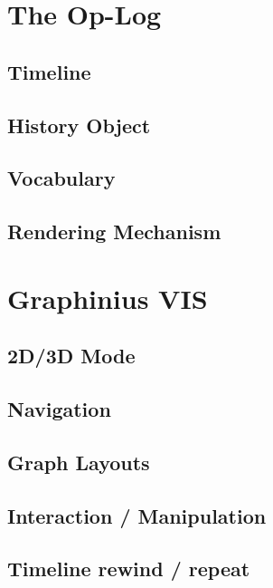 \section{The Op-Log}
\label{sect:op_log}

	\subsection{Timeline}
	\label{ssect:timeline}
	
	\subsection{History Object}
	\label{ssect:history_object}

	\subsection{Vocabulary}
	\label{ssect:vocabulary}	

	\subsection{Rendering Mechanism}
	\label{ssect:rendering}


\section{Graphinius VIS}
\label{sect:graphinius_vis}

	\subsection{2D/3D Mode}
	\label{ssect:vis_2d3d}
	
	\subsection{Navigation}
	\label{ssect:vis_navigation}
	
	\subsection{Graph Layouts}
	\label{ssect:vis_layouts}	
	
	\subsection{Interaction / Manipulation}
	\label{ssect:vis_interact_manipulate}
	
	\subsection{Timeline rewind / repeat}
	\label{ssect:vis_timeline}


